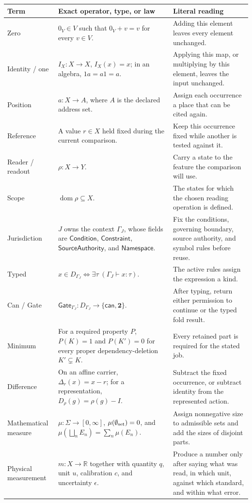 \documentclass[10pt]{article}
\newcommand{\R}{\mathbb R}
\begin{document}
\footnotesize
\setlength{\tabcolsep}{3pt}
\begin{longtable}{@{}p{}p{}p{}@{}}
\toprule Term & Exact operator, type, or law & Literal reading \\ \midrule\endhead
Zero & $0_V\in V$ such that $0_V+v=v$ for every $v\in V$. & Adding this element leaves every element unchanged.\\
Identity / one & $I_X:X\to X$, $I_X(x)=x$; in an algebra, $1a=a1=a$. & Applying this map, or multiplying by this element, leaves the input unchanged.\\
Position & $a:X\to A$, where $A$ is the declared address set. & Assign each occurrence a place that can be cited again.\\
Reference & A value $r\in X$ held fixed during the current comparison. & Keep this occurrence fixed while another is tested against it.\\
Reader / readout & $\rho:X\to Y$. & Carry a state to the feature the comparison will use.\\
Scope & $\operatorname{dom}\rho\subseteq X$. & The states for which the chosen reading operation is defined.\\
Jurisdiction & $J$ owns the context $\Gamma_J$, whose fields are $\mathsf{Condition}$, $\mathsf{Constraint}$, $\mathsf{SourceAuthority}$, and $\mathsf{Namespace}$. & Fix the conditions, governing boundary, source authority, and symbol rules before reuse.\\
Typed & $x\in D_{\Gamma_J}\iff\exists\tau\;(\Gamma_J\vdash x:\tau)$. & The active rules assign the expression a kind.\\
Can / Gate & $\mathsf{Gate}_{\Gamma_J}:D_{\Gamma_J}\to\{\mathsf{can},\mathbf2\}$. & After typing, return either permission to continue or the typed fold result.\\
Minimum & For a required property $P$, $P(K)=1$ and $P(K')=0$ for every proper dependency-deletion $K'\subsetneq K$. & Every retained part is required for the stated job.\\
Difference & On an affine carrier, $\Delta_r(x)=x-r$; for a representation, $D_\rho(g)=\rho(g)-I$. & Subtract the fixed occurrence, or subtract identity from the represented action.\\
Mathematical measure & $\mu:\Sigma\to[0,\infty]$, $\mu(\emptyset_{\rm set})=0$, and $\mu(\bigsqcup_nE_n)=\sum_n\mu(E_n)$. & Assign nonnegative size to admissible sets and add the sizes of disjoint parts.\\
Physical measurement & $m:X\to\R$ together with quantity $q$, unit $u$, calibration $c$, and uncertainty $\epsilon$. & Produce a number only after saying what was read, in which unit, against which standard, and within what error.\\

\end{longtable}
\end{document}
